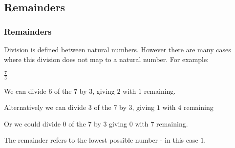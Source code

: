 
\subsection{Remainders}

\subsubsection{Remainders}

Division is defined between natural numbers. However there are many cases where this division does not map to a natural number. For example:

\(\frac{7}{3}\)

We can divide \(6\) of the \(7\) by \(3\), giving \(2\) with \(1\) remaining.

Alternatively we can divide \(3\) of the \(7\) by \(3\), giving \(1\) with \(4\) remaining

Or we could divide \(0\) of the \(7\) by \(3\) giving \(0\) with \(7\) remaining.

The remainder refers to the lowest possible number - in this case \(1\).

